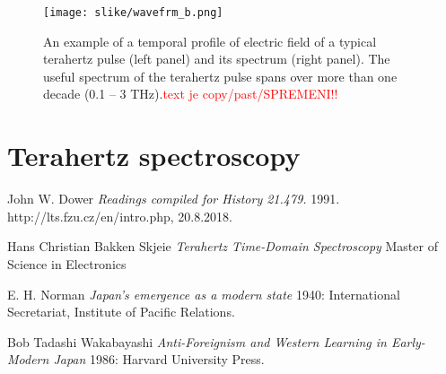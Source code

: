 \documentclass[english,11pt,a4paper]{article}
\numberwithin{equation}{section} %
\numberwithin{figure}{section} %
\numberwithin{table}{section} %
\begin{document}
\begin{figure}[!htb]
\label{TDS-spectrum}
\centering
\texttt{[image: slike/wavefrm\_b.png]}
\caption{ An example of a temporal profile of electric field of a typical terahertz pulse (left panel) and its spectrum (right panel). The useful spectrum of the terahertz pulse spans over more than one decade (0.1 – 3 THz).\textcolor{red}{text je copy/past/SPREMENI!!}  \cite{em-spectrum}}
\end{figure}
%
%
%
%
%
%



\section{Terahertz spectroscopy}




\newpage

  \begin{thebibliography}{}

   John W. Dower {\em Readings compiled for History  21.479.}  1991.
     http://lts.fzu.cz/en/intro.php, 20.8.2018.

   Hans Christian Bakken Skjeie {\em Terahertz Time-Domain Spectroscopy} Master of Science in Electronics

   E. H. Norman {\em Japan's emergence as a modern
  state} 1940: International Secretariat, Institute of Pacific
  Relations.

   Bob Tadashi Wakabayashi {\em Anti-Foreignism and Western
  Learning in Early-Modern Japan} 1986: Harvard University Press.

  \end{thebibliography}
\end{document}
